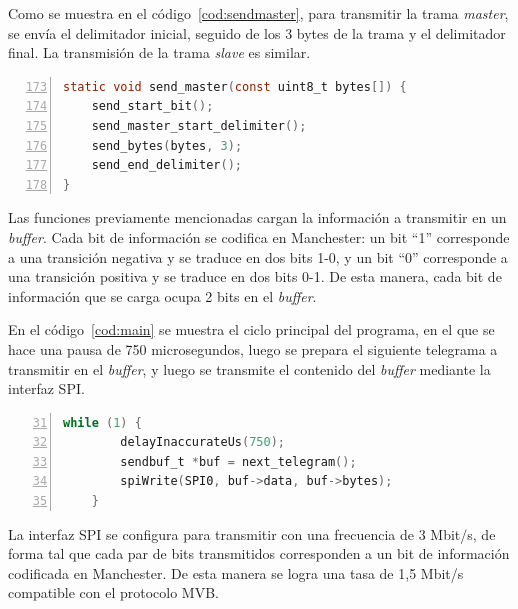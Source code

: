 Como se muestra en el código~\ref{cod:sendmaster}, para transmitir la trama \textit{master}, se envía el delimitador inicial, seguido de los 3 bytes de la trama y el delimitador final. La transmisión de la trama \textit{slave} es similar.

\begin{lstlisting}[label=cod:sendmaster,caption=Secuencia de pasos para transmitir la trama \textit{master} (\texttt{gen.c}).,float=htbp,numberstyle=\footnotesize\ttfamily,language=C,breaklines=true,numbers=left,firstnumber=173,xleftmargin=1cm]
static void send_master(const uint8_t bytes[]) {
    send_start_bit();
    send_master_start_delimiter();
    send_bytes(bytes, 3);
    send_end_delimiter();
}
\end{lstlisting}

Las funciones previamente mencionadas cargan la información a transmitir en un \textit{buffer}. Cada bit de información se codifica en Manchester: un bit ``1'' corresponde a una transición negativa y se traduce en dos bits 1-0, y un bit ``0'' corresponde a una transición positiva y se traduce en dos bits 0-1. De esta manera, cada bit de información que se carga ocupa 2 bits en el \textit{buffer}.

En el código~\ref{cod:main} se muestra el ciclo principal del programa, en el que se hace una pausa de 750 microsegundos, luego se prepara el siguiente telegrama a transmitir en el \textit{buffer}, y luego se transmite el contenido del \textit{buffer} mediante la interfaz SPI.

\begin{lstlisting}[label=cod:main,caption=Ciclo principal del programa (\texttt{main.c}).,float=htbp,numberstyle=\footnotesize\ttfamily,language=C,breaklines=true,numbers=left,firstnumber=31,xleftmargin=1cm]
    while (1) {
        delayInaccurateUs(750);
        sendbuf_t *buf = next_telegram();
        spiWrite(SPI0, buf->data, buf->bytes);
    }
\end{lstlisting}

La interfaz SPI se configura para transmitir con una frecuencia de 3 Mbit/s, de forma tal que cada par de bits transmitidos corresponden a un bit de información codificada en Manchester. De esta manera se logra una tasa de 1,5 Mbit/s compatible con el protocolo MVB.

